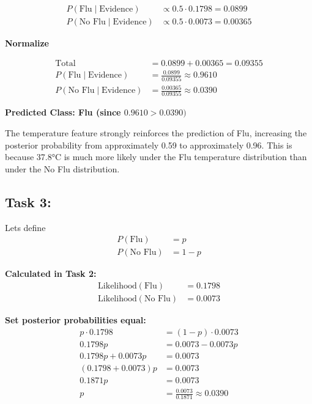 \documentclass[a4paper,12pt]{article}
\begin{document}
\begin{align*}
P(\text{Flu} \mid \text{Evidence}) &\propto 0.5 \cdot 0.1798 = 0.0899 \\
P(\text{No Flu} \mid \text{Evidence}) &\propto 0.5 \cdot 0.0073 = 0.00365
\end{align*}

\textbf{Normalize}

\begin{align*}
\text{Total} &= 0.0899 + 0.00365 = 0.09355 \\
P(\text{Flu} \mid \text{Evidence}) &= \frac{0.0899}{0.09355} \approx 0.9610 \\
P(\text{No Flu} \mid \text{Evidence}) &= \frac{0.00365}{0.09355} \approx 0.0390
\end{align*}

\textbf{Predicted Class: Flu (since $0.9610 > 0.0390)$}

\vspace{1cm}



The temperature feature strongly reinforces the prediction of Flu, increasing the posterior probability from approximately 0.59 to approximately 0.96. This is because 37.8°C is much more likely under the Flu temperature distribution than under the No Flu distribution.


\newpage

\subsection*{Task 3:}


Lets define
\begin{align*}
P(\text{Flu}) &= p \\
P(\text{No Flu}) &= 1 - p
\end{align*}

\textbf{Calculated in Task 2:}
\begin{align*}
\text{Likelihood}(\text{Flu}) &= 0.1798 \\
\text{Likelihood}(\text{No Flu}) &= 0.0073
\end{align*}

\textbf{Set posterior probabilities equal:}
\begin{align*}
p \cdot 0.1798 &= (1 - p) \cdot 0.0073 \\
0.1798p &= 0.0073 - 0.0073p \\
0.1798p + 0.0073p &= 0.0073 \\
(0.1798 + 0.0073)p &= 0.0073 \\
0.1871p &= 0.0073 \\
p &= \frac{0.0073}{0.1871} \approx 0.0390
\end{align*}
\end{document}
